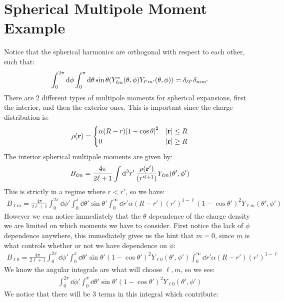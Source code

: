\documentclass[12pt]{article}
\begin{document}
\section{Spherical Multipole Moment Example}
Notice that the spherical harmonics are orthogonal with respect to each other, such that:
\begin{align*}
  \int_0^{2\pi}\dd{\phi}\int_0^\pi\dd{\theta}\sin\theta
  \qty(Y^*_{\ell m}(\theta,\phi)Y_{\ell'm'}(\theta,\phi))
  =\delta_{\ell\ell'}\delta_{mm'}
\end{align*}
There are 2 different types of multipole moments for spherical expansions, first the interior, and then the exterior ones. This is important since the charge distribution is:
\begin{align*}
  \rho(\vb{r})=
  \begin{cases}
    \alpha(R-r)\qty[1-\cos\theta]^2 & \abs{\vb{r}}\leq R\\
    0 & \abs{\vb{r}}\geq R
  \end{cases}
\end{align*}
The interior spherical multipole moments are given by:
\begin{align*}
  B_{\ell m}=\frac{4\pi}{2\ell+1}\int\dd[3]{r'}
  \frac{\rho(\vb{r'})}{(r^{\prime\ell+1})}Y_{\ell m}(\theta',\phi')
\end{align*}
This is strictly in a regime where $r<r'$, so we have:
\begin{align*}
  B_{\ell m}=\frac{4\pi}{2\ell+1}\int_0^{2\pi}\dd{\phi'}
  \int_0^\pi\dd{\theta'}\sin\theta'
  \int_0^\infty\dd{r'}\alpha(R-r')(r')^{1-\ell}(1-\cos\theta')^2
  Y_{\ell m}(\theta',\phi')
\end{align*}
However we can notice immediately that the $\theta$ dependence of the charge density we are limited on which moments we have to consider. First notice the lack of $\phi$ dependence anywhere, this immediately gives us the hint that $m=0$, since $m$ is what controls whether or not we have dependence on $\phi$:
\begin{align*}
  B_{\ell0}=\frac{4\pi}{2\ell+1}\int_0^{2\pi}\dd{\phi'}
  \int_0^\pi\dd{\theta'}\sin\theta'(1-\cos\theta')^2Y_{\ell0}(\theta',\phi')
  \int_0^\infty\dd{r'}\alpha(R-r')(r')^{1-\ell}
\end{align*}
We know the angular integrals are what will choose $\ell,m$, so we see:
\begin{align*}
  \int_0^{2\pi}\dd{\phi'}\int_0^\pi\dd{\theta'}\sin\theta'
  (1-\cos\theta')^2Y_{\ell0}(\theta',\phi')
\end{align*}
We notice that there will be $3$ terms in this integral which contribute:
\end{document}
